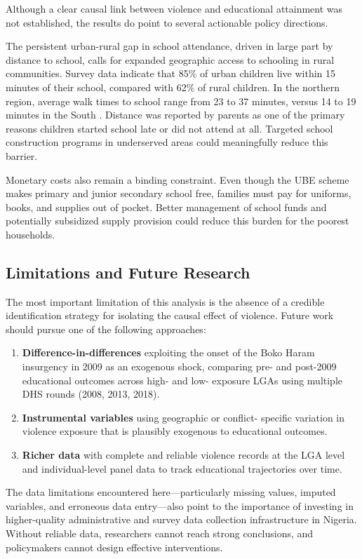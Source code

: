 Although a clear causal link between violence and educational attainment was
not established, the results do point to several actionable policy
directions.

The persistent urban-rural gap in school attendance, driven in large part by
distance to school, calls for expanded geographic access to schooling in
rural communities. Survey data indicate that 85\% of urban children live
within 15 minutes of their school, compared with 62\% of rural children. In
the northern region, average walk times to school range from 23 to 37
minutes, versus 14 to 19 minutes in the South \citep{neds2010}. Distance
was reported by parents as one of the primary reasons children started school
late or did not attend at all. Targeted school construction programs in
underserved areas could meaningfully reduce this barrier.

Monetary costs also remain a binding constraint. Even though the UBE scheme
makes primary and junior secondary school free, families must pay for
uniforms, books, and supplies out of pocket. Better management of school
funds and potentially subsidized supply provision could reduce this burden
for the poorest households.

\subsection{Limitations and Future Research}

The most important limitation of this analysis is the absence of a credible
identification strategy for isolating the causal effect of violence.
Future work should pursue one of the following approaches:

\begin{enumerate}
    \item \textbf{Difference-in-differences} exploiting the onset of the
          Boko Haram insurgency in 2009 as an exogenous shock, comparing
          pre- and post-2009 educational outcomes across high- and low-
          exposure LGAs using multiple DHS rounds (2008, 2013, 2018).
    \item \textbf{Instrumental variables} using geographic or conflict-
          specific variation in violence exposure that is plausibly
          exogenous to educational outcomes.
    \item \textbf{Richer data} with complete and reliable violence records
          at the LGA level and individual-level panel data to track
          educational trajectories over time.
\end{enumerate}

The data limitations encountered here---particularly missing values,
imputed variables, and erroneous data entry---also point to the importance
of investing in higher-quality administrative and survey data collection
infrastructure in Nigeria. Without reliable data, researchers cannot reach
strong conclusions, and policymakers cannot design effective interventions.
